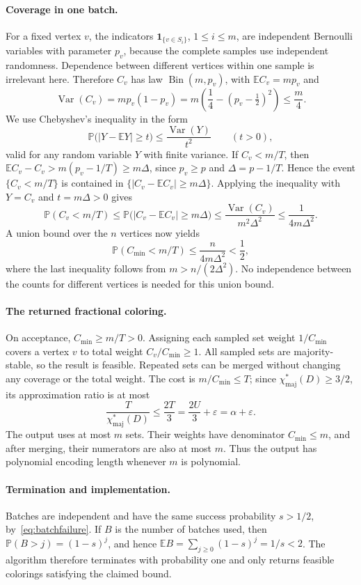 \documentclass[10pt,a4paper]{article}
\DeclareMathOperator{\Bin}{Bin}
\newcommand{\Pp}{\mathbb P}
\newcommand{\E}{\mathbb E}
\newcommand{\chif}{\chi^*_{\mathrm{maj}}}
\newcommand{\abs}[1]{|#1|}
\begin{document}
\paragraph{Coverage in one batch.}
For a fixed vertex \(v\), the indicators \(\mathbf1_{\{v\in S_i\}}\), \(1\le i\le m\), are independent Bernoulli variables with parameter \(p_v\), because the complete samples use independent randomness. Dependence between different vertices within one sample is irrelevant here. Therefore \(C_v\) has law \(\Bin(m,p_v)\), with \(\E C_v=mp_v\) and
\[
\operatorname{Var}(C_v)=mp_v(1-p_v)
=m\left(\frac14-(p_v-\tfrac12)^2\right)\le\frac m4.
\]
We use Chebyshev's inequality in the form
\[
\Pp\bigl(\abs{Y-\E Y}\ge t\bigr)
\le\frac{\operatorname{Var}(Y)}{t^2}\qquad(t>0),
\]
valid for any random variable \(Y\) with finite variance. If \(C_v<m/T\), then \(\E C_v-C_v>m(p_v-1/T)\ge m\Delta\), since \(p_v\ge p\) and \(\Delta=p-1/T\). Hence the event \(\{C_v<m/T\}\) is contained in \(\{\abs{C_v-\E C_v}\ge m\Delta\}\). Applying the inequality with \(Y=C_v\) and \(t=m\Delta>0\) gives
\[
\Pp(C_v<m/T)
\le\Pp\bigl(\abs{C_v-\E C_v}\ge m\Delta\bigr)
\le\frac{\operatorname{Var}(C_v)}{m^2\Delta^2}
\le\frac1{4m\Delta^2}.
\]
A union bound over the \(n\) vertices now yields
\begin{equation}\label{eq:batchfailure}
\Pp(C_{\min}<m/T)\le\frac{n}{4m\Delta^2}<\frac12,
\end{equation}
where the last inequality follows from \(m>n/(2\Delta^2)\). No independence between the counts for different vertices is needed for this union bound.

\paragraph{The returned fractional coloring.}
On acceptance, \(C_{\min}\ge m/T>0\). Assigning each sampled set weight \(1/C_{\min}\) covers a vertex \(v\) to total weight \(C_v/C_{\min}\ge1\). All sampled sets are majority-stable, so the result is feasible. Repeated sets can be merged without changing any coverage or the total weight. The cost is \(m/C_{\min}\le T\); since \(\chif(D)\ge3/2\), its approximation ratio is at most
\[
\frac{T}{\chif(D)}\le\frac{2T}{3}
=\frac{2U}{3}+\varepsilon=\alpha+\varepsilon.
\]
The output uses at most \(m\) sets. Their weights have denominator \(C_{\min}\le m\), and after merging, their numerators are also at most \(m\). Thus the output has polynomial encoding length whenever \(m\) is polynomial.

\paragraph{Termination and implementation.}
Batches are independent and have the same success probability \(s>1/2\), by~\eqref{eq:batchfailure}. If \(B\) is the number of batches used, then \(\Pp(B>j)=(1-s)^j\), and hence \(\E B=\sum_{j\ge0}(1-s)^j=1/s<2\). The algorithm therefore terminates with probability one and only returns feasible colorings satisfying the claimed bound.
\end{document}
